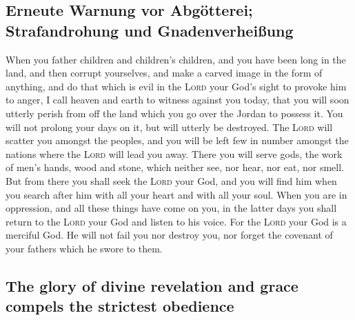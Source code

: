 \hypertarget{erneute-warnung-vor-abguxf6tterei-strafandrohung-und-gnadenverheiuxdfung}{%
\subsection{Erneute Warnung vor Abgötterei; Strafandrohung und
Gnadenverheißung}\label{erneute-warnung-vor-abguxf6tterei-strafandrohung-und-gnadenverheiuxdfung}}

 When you father children and children's children, and
you have been long in the land, and then corrupt yourselves, and make a
carved image in the form of anything, and do that which is evil in the
\textsc{Lord} your God's sight to provoke him to anger, 
I call heaven and earth to witness against you today, that you will soon
utterly perish from off the land which you go over the Jordan to possess
it. You will not prolong your days on it, but will utterly be destroyed.
 The \textsc{Lord} will scatter you amongst the peoples,
and you will be left few in number amongst the nations where the
\textsc{Lord} will lead you away.  There you will serve
gods, the work of men's hands, wood and stone, which neither see, nor
hear, nor eat, nor smell.  But from there you shall seek
the \textsc{Lord} your God, and you will find him when you search after
him with all your heart and with all your soul.  When you
are in oppression, and all these things have come on you, in the latter
days you shall return to the \textsc{Lord} your God and listen to his
voice.  For the \textsc{Lord} your God is a merciful God.
He will not fail you nor destroy you, nor forget the covenant of your
fathers which he swore to them.

\hypertarget{the-glory-of-divine-revelation-and-grace-compels-the-strictest-obedience}{%
\subsection{The glory of divine revelation and grace compels the
strictest
obedience}\label{the-glory-of-divine-revelation-and-grace-compels-the-strictest-obedience}}


